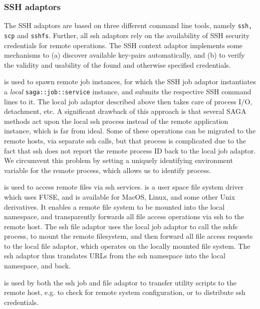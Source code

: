 \documentclass[conference,final]{IEEEtran}
\newcommand{\T}[1]{\texttt{#1}}
\newcommand{\I}[1]{\textit{#1}}
\newcommand{\ssh}[1]{\texttt{ssh}}
\newcommand{\scp}[1]{\texttt{scp}}
\newcommand{\sshfs}[1]{\texttt{sshfs}}
\begin{document}
\subsubsection{SSH adaptors}
The SSH adaptors are based on three different command line tools,
namely {\texttt{ssh, scp}} and {\texttt{sshfs}}.  Further, all ssh
adaptors rely on the availability of SSH security credentials for
remote operations.  The SSH context adaptor implements some mechanisms
to (a) discover available key-pairs automatically, and (b) to verify
the validity and usability of the found and otherwise specified
credentials.
  
{\texttt{\ssh}} is used to spawn remote job instances, for which the
SSH job adaptor instantiates a \I{local} \T{saga::job::service}
instance, and submits the respective SSH command lines to it.  The
local job adaptor described above then takes care of process I/O,
detachment, etc.  A significant drawback of this approach is that
several SAGA methods act upon the local ssh process instead of the
remote application instance, which is far from ideal. Some of these
operations can be migrated to the remote hosts, via separate ssh
calls, but that process is complicated due to the fact that ssh does
not report the remote process ID back to the local job adaptor.  We
circumvent this problem by setting a uniquely identifying environment
variable for the remote process, which allows us to identify process.

{\texttt{\sshfs}} is used to access remote files via ssh services.
{\texttt{\sshfs}} is a user space file system driver which uses FUSE,
and is available for MacOS, Linux, and some other Unix derivatives.
It enables a remote file system to be mounted into the local
namespace, and transparently forwards all file access operations via
ssh to the remote host.  The ssh file adaptor uses the local job
adaptor to call the sshfs process, to mount the remote filesystem, and
then forward all file access requests to the local file adaptor, which
operates on the locally mounted file system.  The ssh adaptor thus
translates URLs from the ssh namespace into the local namespace, and
back.

{\texttt{\scp}} is used by both the ssh job and file adaptor to
transfer utility scripts to the remote host, e.g. to check for remote
system configuration, or to distribute ssh credentials.
\end{document}
